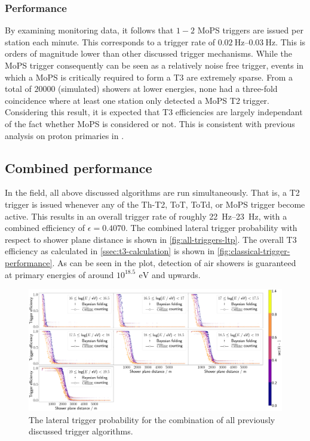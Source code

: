 \subsubsection{Performance}
\label{ssec:mops-performance}

By examining monitoring data, it follows that $1-2$ MoPS triggers are issued per station each minute. This corresponds to a trigger rate of 
$\SIrange[range-phrase = \,\text{to}\,]{0.02}{0.03}{\hertz}$. This is orders of magnitude lower than other discussed trigger mechanisms. While the MoPS trigger 
consequently can be seen as a relatively noise free trigger, events in which a MoPS is critically required to form a T3 are extremely sparse. From a total of 
$20000$ (simulated) showers at lower energies, none had a three-fold coincidence where at least one station only detected a MoPS T2 trigger. Considering this 
result, it is expected that T3 efficiencies are largely independant of the fact whether MoPS is considered or not. This is consistent with previous analysis
on proton primaries in \cite{MOPST3}.

\subsection{Combined performance}
\label{ssec:combined-performance}

In the field, all above discussed algorithms are run simultaneously. That is, a T2 trigger is issued whenever any of the Th-T2, ToT, ToTd, or MoPS trigger become 
active. This results in an overall trigger rate of roughly \SIrange[range-phrase = \,\text{to}\,]{22}{23}{\hertz}, with a combined efficiency of 
$\epsilon = 0.4070$. The combined lateral trigger probability with respect to shower plane distance is shown in \autoref{fig:all-triggers-ltp}. The overall T3 
efficiency as calculated in \autoref{ssec:t3-calculation} is shown in \autoref{fig:classical-trigger-performance}. As can be seen in the plot, detection of air 
showers is guaranteed at primary energies of around $10^{18.5}\,\SI{}{\electronvolt}$ and upwards.

\begin{figure}
	\centering
	\includegraphics[width=\textwidth]{./plots/all_LTP_comparison.png}
	\caption{The lateral trigger probability for the combination of all previously discussed trigger algorithms.} 
	\label{fig:all-triggers-ltp}
\end{figure}
